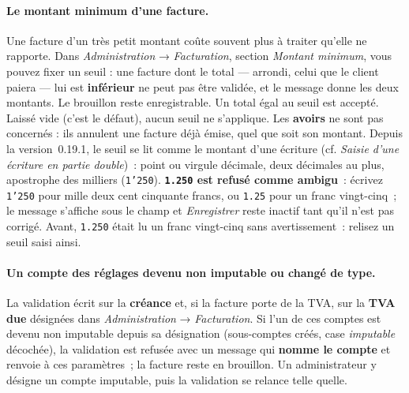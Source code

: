 \documentclass[a4paper,11pt,oneside]{article}
\begin{document}
\paragraph{Le montant minimum d'une facture.} Une facture d'un très petit montant coûte souvent plus à traiter qu'elle ne rapporte. Dans \emph{Administration} → \emph{Facturation}, section \emph{Montant minimum}, vous pouvez fixer un seuil : une facture dont le total --- arrondi, celui que le client paiera --- lui est \textbf{inférieur} ne peut pas être validée, et le message donne les deux montants. Le brouillon reste enregistrable. Un total égal au seuil est accepté. Laissé vide (c'est le défaut), aucun seuil ne s'applique. Les \textbf{avoirs} ne sont pas concernés : ils annulent une facture déjà émise, quel que soit son montant. Depuis la version~0.19.1, le seuil se lit comme le montant d'une écriture (cf. \emph{Saisie d'une écriture en partie double})~: point ou virgule décimale, deux décimales au plus, apostrophe des milliers (\texttt{1'250}). \textbf{\texttt{1.250} est refusé comme ambigu}~: écrivez \texttt{1'250} pour mille deux cent cinquante francs, ou \texttt{1.25} pour un franc vingt-cinq~; le message s'affiche sous le champ et \emph{Enregistrer} reste inactif tant qu'il n'est pas corrigé. Avant, \texttt{1.250} était lu un franc vingt-cinq sans avertissement~: relisez un seuil saisi ainsi.

\paragraph{Un compte des réglages devenu non imputable ou changé de type.} La validation écrit sur la \textbf{créance} et, si la facture porte de la TVA, sur la \textbf{TVA due} désignées dans \emph{Administration} → \emph{Facturation}. Si l'un de ces comptes est devenu non imputable depuis sa désignation (sous-comptes créés, case \emph{imputable} décochée), la validation est refusée avec un message qui \textbf{nomme le compte} et renvoie à ces paramètres~; la facture reste en brouillon. Un administrateur y désigne un compte imputable, puis la validation se relance telle quelle.
\end{document}
